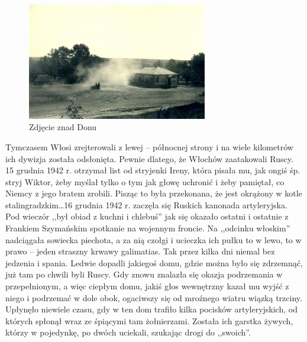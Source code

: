 \begin{figure}[!h]
\begin{center}
\includegraphics[width=0.7\textwidth]{photo/don.jpg}
\caption{Zdjęcie znad Donu}
\end{center}
\end{figure}

Tymczasem Włosi zrejterowali z lewej -- północnej strony i na wiele kilometrów ich dywizja została odsłonięta. Pewnie dlatego, że Włochów zaatakowali Ruscy. 15 grudnia 1942 r. otrzymał list od stryjenki Ireny, która pisała mu, jak ongiś śp. stryj Wiktor, żeby myślał tylko o tym jak głowę uchronić i żeby pamiętał, co Niemcy z jego bratem zrobili. Pisząc to była przekonana, że jest okrążony w kotle stalingradzkim\ldots 16 grudnia 1942 r. zaczęła się Ruskich kanonada artyleryjska. Pod wieczór ,,był obiad z kuchni i chlebuś'' jak się okazało ostatni i ostatnie z Frankiem Szymańskim spotkanie na wojennym froncie. Na ,,odcinku włoskim'' nadciągała sowiecka piechota, a za nią czołgi i ucieczka ich pułku to w lewo, to w prawo -- jeden straszny krwawy galimatias. Tak przez kilka dni niemal bez jedzenia i spania. Ledwie dopadli jakiegoś domu, gdzie można było się zdrzemnąć, już tam po chwili byli Ruscy. Gdy znowu znalazła się okazja podrzemania w przepełnionym, a więc ciepłym domu, jakiś głos wewnętrzny kazał mu wyjść z niego i podrzemać w dole obok, ogaciwszy się od mroźnego wiatru wiązką trzciny. Upłynęło niewiele czasu, gdy w ten dom trafiło kilka pocisków artyleryjskich, od których spłonął wraz ze śpiącymi tam żołnierzami. Została ich garstka żywych, którzy w pojedynkę, po dwóch uciekali, szukając drogi do ,,swoich''.

